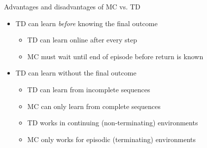 \bgroup
\begin{frame}{Advantages and disadvantages of MC vs. TD}
\begin{itemize}
\item TD can learn \emph{before} knowing the final outcome
\begin{itemize}
\item TD can learn online after every step
\item MC must wait until end of episode before return is known
\end{itemize}
\item TD can learn without the final outcome
\begin{itemize}
\item TD can learn from incomplete sequences
\item MC can only learn from complete sequences
\item TD works in continuing (non-terminating) environments
\item MC only works for episodic (terminating) environments
\end{itemize}
\end{itemize}
\end{frame}
\egroup